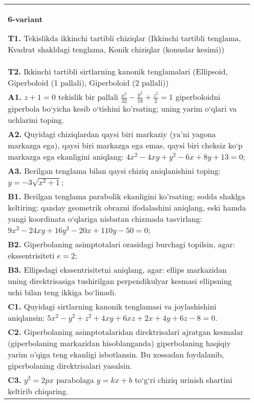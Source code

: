 \documentclass{article}
\begin{document}
\begin{tabular}{m{17cm}}
\textbf{6-variant}
\newline

\textbf{T1.} Tekislikda ikkinchi tartibli chiziqlar (Ikkinchi tartibli tenglama, Kvadrat shakldagi tenglama, Konik chiziqlar (konuslar kesimi)) \\
\textbf{T2.} Ikkinchi tartibli sirtlarning kanonik tenglamalari (Ellipsoid, Giperboloid (1 pallali), Giperboloid (2 pallali)) \\
\textbf{A1.} $z+1=0$ tekislik bir pallali $\frac{x^2}{32}-\frac{y^2}{18}+\frac{z^2}{2}=1$ giperboloidni giperbola bo‘yicha kesib o‘tishini ko'rsating; uning yarim o‘qlari va uchlarini toping. \\
\textbf{A2.} Quyidagi chiziqlardan qaysi biri markaziy (ya’ni yagona markazga ega), qaysi biri markazga ega emas, qaysi biri cheksiz ko‘p markazga ega ekanligini aniqlang: $4 x^2-4 x y+y^2-6 x+8 y+13=0$; \\
\textbf{A3.} Berilgan tenglama bilan qaysi chiziq aniqlanishini toping: $y=-3 \sqrt{x^2+1}$; \\
\textbf{B1.} Berilgan tenglama parabolik ekanligini ko'rsating; sodda shaklga keltiring; qanday geometrik obrazni ifodalashini aniqlang, eski hamda yangi koordinata o‘qlariga nisbatan chizmada tasvirlang: $9 x^2-24 x y+16 y^2-20 x+110 y-50=0$; \\
\textbf{B2.} Giperbolaning asimptotalari orasidagi burchagi topilsin, agar: ekssentrisiteti $e=2$; \\
\textbf{B3.} Ellipsdagi ekssentrisitetni aniqlang, agar: ellips markazidan uning direktrisasiga tushirilgan perpendikulyar kesmasi ellipsning uchi bilan teng ikkiga bo‘linadi. \\
\textbf{C1.} Quyidagi sirtlarning kanonik tenglamasi va joylashishini aniqlansin: $5 x^2-y^2+z^2+4 x y+6 x z+2 x+4 y+6 z-8=0$. \\
\textbf{C2.} Giperbolaning asimptotalaridan direktrisalari ajratgan kesmalar (giperbolaning markazidan hisoblanganda) giperbolaning haqiqiy yarim o'qiga teng ekanligi isbotlansin. Bu xossadan foydalanib, giperbolaning direktrisalari yasalsin. \\
\textbf{C3.} $y^2=2 p x$ parabolaga $y=k x+b$ to‘g‘ri chiziq urinish shartini keltirib chiqaring. \\

\end{tabular}
\vspace{1cm}
\end{document}
